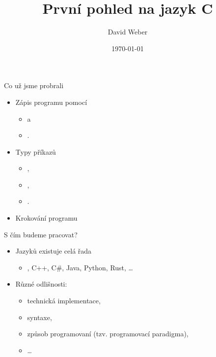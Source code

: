 \documentclass[14pt]{beamer}
\title{První pohled na jazyk C}
\author{David Weber}
\date{\today}
\begin{document}



    \begin{frame}
        \titlepage
    \end{frame}

    \begin{frame}[t]{Co už jsme probrali}
        \begin{itemize}
            \item Zápis programu pomocí
            \begin{itemize}
                \item {} a
                \item {}.
            \end{itemize}
            \item Typy příkazů
            \begin{itemize}
                \item {},
                \item {},
                \item {}.

            \end{itemize}
            \item Krokování programu
        \end{itemize}
        \begin{center}
             
        \end{center}
    \end{frame}

    \begin{frame}[t]{S čím budeme pracovat?}
        \begin{itemize}
            \item Jazyků existuje celá řada
            \begin{itemize}
                \item {}, C++, C\#, Java, Python, Rust, \dots
            \end{itemize}
            \item Různé odlišnosti:
            \begin{itemize}
                \item technická implementace,
                \item syntaxe,
                \item způsob programovaní (tzv. programovací paradigma),
                \item \dots
            \end{itemize}
        \end{itemize}
    \end{frame}
\end{document}
